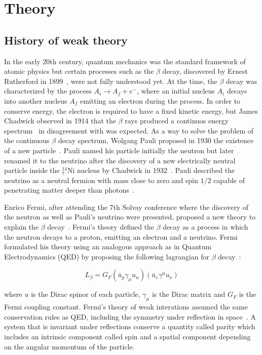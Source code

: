 \section{Theory}\label{sec:WBoson_Theory}


\subsection{History of weak theory}

In the early 20th century, quantum mechanics was the standard framework of atomic physics but certain processes such as the $\beta$ decay, discovered by Ernest Rutherford in 1899~\cite{RutherfordBetaDecay}, were not fully understood yet. At the time, the $\beta$ decay was characterized by the process $A_{i}\rightarrow{A_{f}+e^{-}}$, where an initial nucleus $A_{i}$ decays into another nucleus $A_{f}$ emitting an electron during the process. In order to conserve energy, the electron is required to have a fixed kinetic energy, but James Chadwick observed in 1914 that the $\beta$ rays produced a continuos energy spectrum~\cite{BetaDecay_1,BetaDecay_2} in disagreement with was expected. As a way to solve the problem of the continuous $\beta$ decay spectrum, Wolgang Pauli proposed in 1930 the existence of a new particle~\cite{Neutrino_1,Neutrino_2}. Pauli named his particle initially the neutron but later renamed it to the neutrino after the discovery of a new electrically neutral particle inside the ${}_{7}^{14}\mathrm{Ni}$ nucleus by Chadwick in 1932~\cite{Neutron}. Pauli described the neutrino as a neutral fermion with mass close to zero and spin $1/2$ capable of penetrating matter deeper than photons~\cite{Neutrino_1}.

Enrico Fermi, after attending the 7th Solvay conference where the discovery of the neutron as well as Pauli's neutrino were presented, proposed a new theory to explain the $\beta$ decay~\cite{FermiWeakTheory_1}. Fermi's theory defined the $\beta$ decay as a process in which the neutron decays to a proton, emitting an electron and a neutrino. Fermi formulated his theory using an analogous approach as in Quantum Electrodynamics (QED) by proposing the following lagrangian for $\beta$ decay~\cite{FermiWeakTheory_2}:

\begin{equation}
L_{\beta}=G_{F}\left(\bar{u}_{p}\gamma_{\mu}u_{n}\right)\left(\bar{u}_{e}\gamma^{\mu}u_{\nu}\right)
\end{equation}

where $u$ is the Dirac spinor of each particle, $\gamma_{\mu}$ is the Dirac matrix and $G_{F}$ is the Fermi coupling constant. Fermi's theory of weak interations assumed the same conservation rules as QED, including the symmetry under reflection in space~\cite{FermiWeakTheory_2}. A system that is invariant under reflections conserve a quantity called parity which includes an intrinsic component called spin and a spatial component depending on the angular momentum of the particle.

